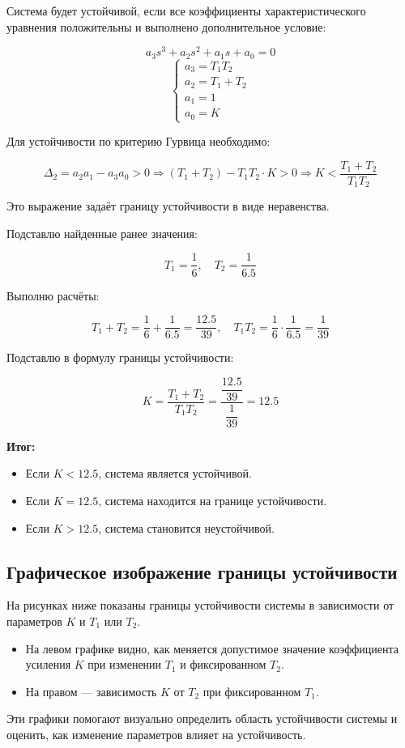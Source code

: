 \documentclass[a4paper,12pt]{article}
\begin{document}
		
		Система будет устойчивой, если все коэффициенты характеристического уравнения положительны и выполнено дополнительное условие:
		
		\[
		a_3 s^3 + a_2 s^2 + a_1 s + a_0 = 0
		\]
		\[
		\begin{cases}
			a_3 = T_1 T_2 \\
			a_2 = T_1 + T_2 \\
			a_1 = 1 \\
			a_0 = K
		\end{cases}
		\]
		
		Для устойчивости по критерию Гурвица необходимо:
		
		\[
		\Delta_2 = a_2 a_1 - a_3 a_0 > 0
		\Rightarrow (T_1 + T_2) - T_1 T_2 \cdot K > 0
		\Rightarrow K < \frac{T_1 + T_2}{T_1 T_2}
		\]
		
		Это выражение задаёт границу устойчивости в виде неравенства.
		
		
		Подставлю найденные ранее значения:
		
		\[
		T_1 = \frac{1}{6}, \quad T_2 = \frac{1}{6.5}
		\]
		
		Выполню расчёты:
		
		\[
		T_1 + T_2 = \frac{1}{6} + \frac{1}{6.5} = \frac{12.5}{39}, \quad
		T_1 T_2 = \frac{1}{6} \cdot \frac{1}{6.5} = \frac{1}{39}
		\]
		
		Подставлю в формулу границы устойчивости:
		
		\[
		K = \frac{T_1 + T_2}{T_1 T_2} = \dfrac{\dfrac{12.5}{39}}{\dfrac{1}{39}} = 12.5
		\]
		
		\textbf{Итог: }
		
		\begin{itemize}
			\item Если $K < 12.5$, система является устойчивой.
			\item Если $K = 12.5$, система находится на границе устойчивости.
			\item Если $K > 12.5$, система становится неустойчивой.
		\end{itemize}
		
		\subsection{Графическое изображение границы устойчивости}
		
		На рисунках ниже показаны границы устойчивости системы в зависимости от параметров \(K\) и \(T_1\) или \(T_2\).  
		\begin{itemize}
			\item На левом графике видно, как меняется допустимое значение коэффициента усиления \(K\) при изменении \(T_1\) и фиксированном \(T_2\).
			\item На правом — зависимость \(K\) от \(T_2\) при фиксированном \(T_1\).
		\end{itemize}
		Эти графики помогают визуально определить область устойчивости системы и оценить, как изменение параметров влияет на устойчивость.
		
\end{document}
